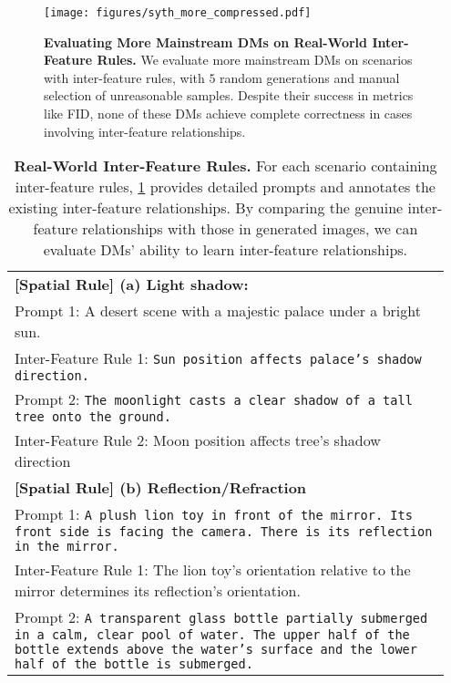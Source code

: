 \begin{figure}
\setlength{\abovecaptionskip}{-1cm}
  \centering
  \texttt{[image: figures/syth\_more\_compressed.pdf]}
\vspace*{-8mm}
  \caption{\textbf{Evaluating More Mainstream DMs on Real-World Inter-Feature Rules.} We evaluate more mainstream DMs on scenarios with inter-feature rules, with $5$ random generations and manual selection of unreasonable samples. Despite their success in metrics like FID, none of these DMs achieve complete correctness in cases involving inter-feature relationships. }
  \label{fig:syth_more}
\end{figure}

\begin{table}[]
	\centering
	\caption{\textbf{Real-World Inter-Feature Rules.} For each scenario containing inter-feature rules, \cref{tab:prompt} provides detailed prompts and annotates the existing inter-feature relationships. By comparing the genuine inter-feature relationships with those in generated images, we can evaluate DMs' ability to learn inter-feature relationships.}
 \label{tab:prompt}
 \vspace{0pt} 
	\begin{tabular}{m{0.95\linewidth}}
		\toprule
		\textbf{[Spatial Rule] (a) Light shadow:}\\
		Prompt 1: {A desert scene with a majestic palace under a bright sun.} \\
        Inter-Feature Rule 1: \texttt{Sun position affects palace's shadow direction.}\\
		Prompt 2: \texttt{The moonlight casts a clear shadow of a tall tree onto the ground.} \\
        Inter-Feature Rule 2: {Moon position affects tree's shadow direction}\\
		\midrule
		\textbf{[Spatial Rule] (b) Reflection/Refraction}\\
		Prompt 1: \texttt{A plush lion toy in front of the mirror. Its front side is facing the camera. There is its reflection in the mirror.} \\
        Inter-Feature Rule 1: {The lion toy's orientation relative to the mirror determines its reflection's orientation.}\\
        Prompt 2: \texttt{A transparent glass bottle partially submerged in a calm, clear pool of water. The upper half of the bottle extends above the water's surface and the lower half of the bottle is submerged.} \\

\end{tabular}
\end{table}

